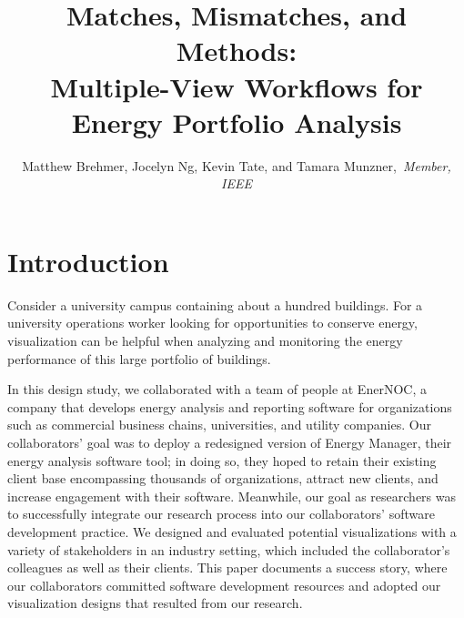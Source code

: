 \documentclass[journal]{vgtc}                %
\title{Matches, Mismatches, and Methods: \\ Multiple-View Workflows for Energy Portfolio Analysis}
\author{Matthew Brehmer, Jocelyn Ng, Kevin Tate, and Tamara Munzner,~\textit{Member, IEEE}}
\begin{document}

\maketitle



\section{Introduction}
\label{introduction}


Consider a university campus containing about a hundred buildings. 
For a university operations worker looking for opportunities to conserve energy, visualization can be helpful when analyzing and monitoring the energy performance of this large portfolio of buildings. 

In this design study, we collaborated with a team of people at EnerNOC, a company that develops energy analysis and reporting software for organizations such as commercial business chains, universities, and utility companies.
Our collaborators' goal was to deploy a redesigned version of Energy Manager, their energy analysis software tool; in doing so, they hoped to retain their existing client base encompassing thousands of organizations, attract new clients, and increase engagement with their software. 
Meanwhile, our goal as researchers was to successfully integrate our research process into our collaborators' software development practice.
We designed and evaluated potential visualizations with a variety of stakeholders in an industry setting, which included the collaborator's colleagues as well as their clients.
This paper documents a success story, where our collaborators committed software development resources and adopted our visualization designs that resulted from our research.
\end{document}
